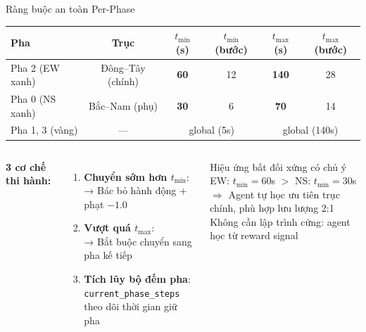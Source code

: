 \begin{frame}{Ràng buộc an toàn Per-Phase}
  \begin{center}
  \begin{tabular}{lccccc}
    \toprule
    \textbf{Pha} & \textbf{Trục} & $t_{\min}$ (s) & $t_{\min}$ (bước) & $t_{\max}$ (s) & $t_{\max}$ (bước)\\
    \midrule
    Pha 2 (EW xanh) & Đông--Tây (chính) & \textbf{60} & 12 & \textbf{140} & 28\\
    Pha 0 (NS xanh) & Bắc--Nam (phụ)    & \textbf{30} & 6  & \textbf{70}  & 14\\
    Pha 1, 3 (vàng) & ---               & \multicolumn{2}{c}{global (5s)} & \multicolumn{2}{c}{global (140s)}\\
    \bottomrule
  \end{tabular}
  \end{center}

  \vspace{6pt}
  \begin{columns}[T]
    \textbf{3 cơ chế thi hành:}
    \begin{enumerate}
      \item \textbf{Chuyển sớm hơn $t_{\min}$}:\\
            → Bác bỏ hành động + phạt $-1.0$
      \item \textbf{Vượt quá $t_{\max}$}:\\
            → Bắt buộc chuyển sang pha kế tiếp
      \item \textbf{Tích lũy bộ đếm pha}:\\
            \texttt{current\_phase\_steps} theo dõi thời gian giữ pha
    \end{enumerate}

    \begin{alertblock}{Hiệu ứng bất đối xứng có chủ ý}
      EW: $t_{\min} = 60$s $>$ NS: $t_{\min} = 30$s\\[4pt]
      $\Rightarrow$ Agent tự học ưu tiên trục chính, phù hợp lưu lượng 2:1\\[4pt]
      Không cần lập trình cứng: agent học từ reward signal
    \end{alertblock}
  \end{columns}
\end{frame}

